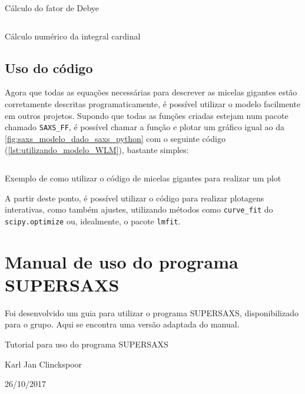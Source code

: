 \begin{apendicesenv}
\begin{listing}[h]
	\inputminted{python}{./python/cadeia_kratky_porod_inicial_4.py}
	\caption{Cálculo do fator de Debye}
	\label{lst:cadeia_KP_Debye}
\end{listing}

\begin{listing}[h]
	\inputminted{python}{./python/cadeia_kratky_porod_inicial_5.py}
	\caption{Cálculo numérico da integral cardinal}  %
	\label{lst:cadeia_KP_SI}
\end{listing}

\section{Uso do código}

Agora que todas as equações necessárias para descrever as micelas gigantes estão corretamente descritas programaticamente, é possível utilizar o modelo facilmente em outros projetos. Supondo que todas as funções criadas estejam num pacote chamado \texttt{SAXS\_FF}, é possível chamar a função e plotar um gráfico igual ao da \autoref{fig:saxs_modelo_dado_saxs_python} com o seguinte código (\ref{lst:utilizando_modelo_WLM}), bastante simples:

\begin{listing}[h]
	\inputminted{python}{./python/uso_modelo.py}
	\caption{Exemplo de como utilizar o código de micelas gigantes para realizar um plot}  %
	\label{lst:utilizando_modelo_WLM}
\end{listing}

A partir deste ponto, é possível utilizar o código para realizar plotagens interativas, como também ajustes, utilizando métodos como \texttt{curve\_fit} do \texttt{scipy.optimize} ou, idealmente, o pacote \texttt{lmfit}.

\chapter{Manual de uso do programa SUPERSAXS}
\label{sec:manual_SUPERSAXS}
Foi desenvolvido um guia para utilizar o programa SUPERSAXS, disponibilizado para o grupo. Aqui se encontra uma versão adaptada do manual.

\begin{center}
	\Huge{Tutorial para uso do programa SUPERSAXS}
	
	\Large{Karl Jan Clinckspoor}
	
	\large{26/10/2017}
\end{center}


\end{apendicesenv}
